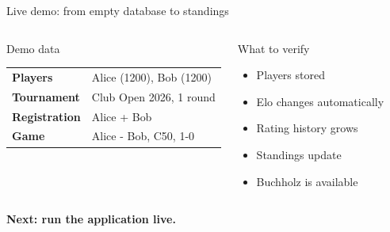 \documentclass[aspectratio=169,11pt]{beamer}
\newcommand{\bigidea}[1]{\begin{center}\color{thgablue}\bfseries\Large #1\end{center}}
\begin{document}
\begin{frame}{Live demo: from empty database to standings}
\vspace{0.15cm}
\begin{columns}[T,onlytextwidth]
    \begin{block}{Demo data}
      \small
      \begin{tabular}{>{\bfseries}p{2.2cm}p{4.5cm}}
        Players & Alice (1200), Bob (1200) \\
        Tournament & Club Open 2026, 1 round \\
        Registration & Alice + Bob \\
        Game & Alice - Bob, C50, 1-0 \\
      \end{tabular}
    \end{block}
    \begin{block}{What to verify}
      \small
      \begin{itemize}\setlength\itemsep{0.38em}
        \item Players stored
        \item Elo changes automatically
        \item Rating history grows
        \item Standings update
        \item Buchholz is available
      \end{itemize}
    \end{block}
\end{columns}
\vspace{0.4cm}
\bigidea{Next: run the application live.}
\end{frame}
\end{document}

